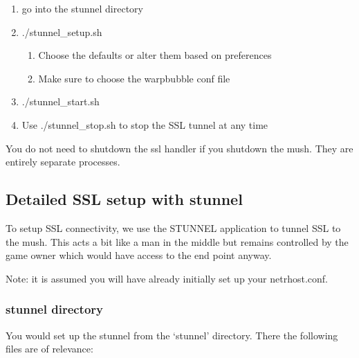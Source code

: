 \documentclass[letterpaper,10pt,english]{sphinxmanual}
\begin{document}
\begin{enumerate}
\begin{enumerate}
\begin{enumerate}
\end{enumerate}

\end{enumerate}

\item {} 
\sphinxAtStartPar
go into the stunnel directory

\item {} 
\sphinxAtStartPar
./stunnel\_setup.sh
\begin{enumerate}
%
\item {} 
\sphinxAtStartPar
Choose the defaults or alter them based on preferences

\item {} 
\sphinxAtStartPar
Make sure to choose the warpbubble conf file

\end{enumerate}

\item {} 
\sphinxAtStartPar
./stunnel\_start.sh

\item {} 
\sphinxAtStartPar
Use ./stunnel\_stop.sh to stop the SSL tunnel at any time

\end{enumerate}

\sphinxAtStartPar
You do not need to shutdown the ssl handler if you shutdown the mush.  They
are entirely separate processes.


\subsection{Detailed SSL setup with stunnel}
\label{\detokenize{security:detailed-ssl-setup-with-stunnel}}
\sphinxAtStartPar
To setup SSL connectivity, we use the STUNNEL application to tunnel SSL to
the mush.  This acts a bit like a man in the middle but remains controlled
by the game owner which would have access to the end point anyway.

\sphinxAtStartPar
Note: it is assumed you will have already initially set up your netrhost.conf.


\subsubsection{stunnel directory}
\label{\detokenize{security:stunnel-directory}}
\sphinxAtStartPar
You would set up the stunnel from the ‘stunnel’ directory.  There the following
files are of relevance:
\end{document}
